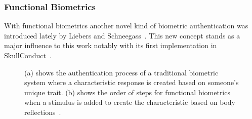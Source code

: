 \subsubsection{Functional Biometrics} With functional biometrics another novel kind of biometric authentication was introduced lately by Liebers and Schneegass~\cite{schneegass2020functbiometric}.
This new concept stands as a major influence to this work notably with its first implementation in SkullConduct~\cite{SkullConduct}. 
\begin{figure}
	\begin{center}
		\hspace{0.5cm}
	\end{center}
	\caption{(a) shows the authentication process of a traditional biometric system where a characteristic response is created based on someone's unique trait.
	(b) shows the order of steps for functional biometrics when a stimulus is added to create the characteristic based on body reflections~\cite{schneegass2020functbiometric}.}
	\label{fig:biometricsVersions}
\end{figure}

